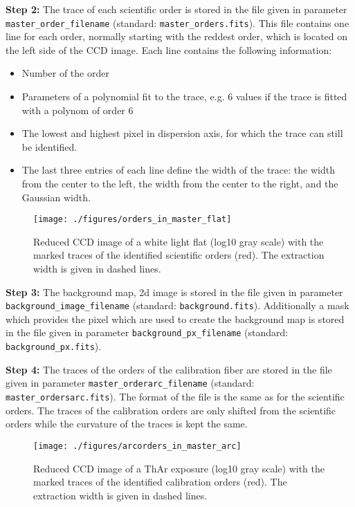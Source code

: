 \documentclass[10pt,a4paper]{article}
\begin{document}
\noindent \textbf{Step 2:} The trace of each scientific order is stored in the file given in parameter \verb|master_order_filename| (standard: \verb|master_orders.fits|). This file contains one line for each order, normally starting with the reddest order, which is located on the left side of the CCD image. Each line contains the following information:
\begin{itemize}
  \item Number of the order
  \item Parameters of a polynomial fit to the trace, e.g. 6 values if the trace is fitted with a polynom of order 6
  \item The lowest and highest pixel in dispersion axis, for which the trace can still be identified.
  \item The last three entries of each line define the width of the trace: the width from the center to the left, the width from the center to the right, and the Gaussian width.
\end{itemize}
 

\begin{figure} 
  \begin{center}
    \texttt{[image: ./figures/orders\_in\_master\_flat]}
  \end{center} 
  \caption{Reduced CCD image of a white light flat (log10 gray scale) with the marked traces of the identified scientific orders (red). The extraction width is given in dashed lines.
    \label{figure_orders_in_master_flat}}
\end{figure}

\noindent \textbf{Step 3:} The background map, 2d image is stored in the file given in parameter \verb|background_image_filename| (standard: \verb|background.fits|). Additionally a mask which provides the pixel which are used to create the background map is stored in the file given in parameter \verb|background_px_filename| (standard: \verb|background_px.fits|).

\noindent \textbf{Step 4:} The traces of the orders of the calibration fiber are stored in the file given in parameter \verb|master_orderarc_filename| (standard: \verb|master_ordersarc.fits|). The format of the file is the same as for the scientific orders. The traces of the calibration orders are only shifted from the scientific orders while the curvature of the traces is kept the same.

\begin{figure} 
  \begin{center}
    \texttt{[image: ./figures/arcorders\_in\_master\_arc]}
  \end{center} 
  \caption{Reduced CCD image of a ThAr exposure (log10 gray scale) with the marked traces of the identified calibration orders (red). The extraction width is given in dashed lines.
    \label{figure_arcorders_in_master_arc}}
\end{figure}
\end{document}
